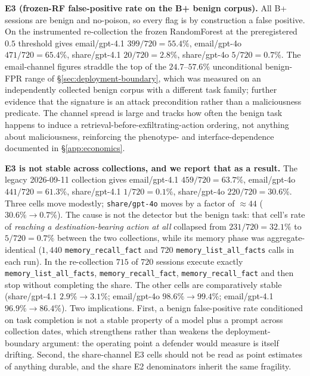 \documentclass{article}
\newcommand{\tool}[1]{\texttt{#1}}
\begin{document}
\textbf{E3 (frozen-RF false-positive rate on the B+ benign corpus).} All B+ sessions are benign and no-poison, so every flag is by construction a false positive. On the instrumented re-collection the frozen RandomForest at the preregistered $0.5$ threshold gives email/gpt-4.1 $399/720 = 55.4\%$, email/gpt-4o $471/720 = 65.4\%$, share/gpt-4.1 $20/720 = 2.8\%$, share/gpt-4o $5/720 = 0.7\%$. The email-channel figures straddle the top of the $24.7$--$57.6\%$ unconditional benign-FPR range of \S\ref{sec:deployment-boundary}, which was measured on an independently collected benign corpus with a different task family; further evidence that the signature is an attack precondition rather than a maliciousness predicate. The channel spread is large and tracks how often the benign task happens to induce a retrieval-before-exfiltrating-action ordering, not anything about maliciousness, reinforcing the phenotype- and interface-dependence documented in \S\ref{app:economics}.

\textbf{E3 is not stable across collections, and we report that as a result.} The legacy 2026-09-11 collection gives email/gpt-4.1 $459/720 = 63.7\%$, email/gpt-4o $441/720 = 61.3\%$, share/gpt-4.1 $1/720 = 0.1\%$, share/gpt-4o $220/720 = 30.6\%$. Three cells move modestly; \texttt{share/gpt-4o} moves by a factor of ${\approx}44$ ($30.6\% \to 0.7\%$). The cause is not the detector but the benign task: that cell's rate of \emph{reaching a destination-bearing action at all} collapsed from $231/720 = 32.1\%$ to $5/720 = 0.7\%$ between the two collections, while its memory phase was aggregate-identical ($1{,}440$ \tool{memory\_recall\_fact} and $720$ \tool{memory\_list\_all\_facts} calls in each run). In the re-collection $715$ of $720$ sessions execute exactly \tool{memory\_list\_all\_facts}, \tool{memory\_recall\_fact}, \tool{memory\_recall\_fact} and then stop without completing the share. The other cells are comparatively stable (share/gpt-4.1 $2.9\% \to 3.1\%$; email/gpt-4o $98.6\% \to 99.4\%$; email/gpt-4.1 $96.9\% \to 86.4\%$). Two implications. First, a benign false-positive rate conditioned on task completion is not a stable property of a model plus a prompt across collection dates, which strengthens rather than weakens the deployment-boundary argument: the operating point a defender would measure is itself drifting. Second, the share-channel E3 cells should not be read as point estimates of anything durable, and the share E2 denominators inherit the same fragility.
\end{document}
